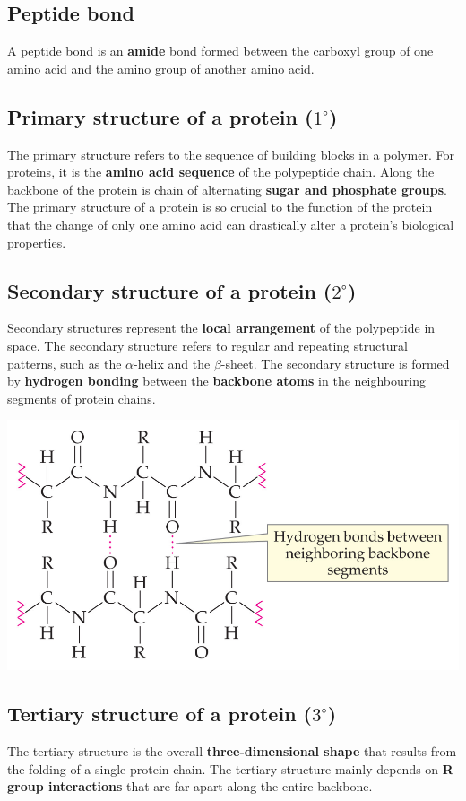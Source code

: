 \documentclass[11pt]{article}
\begin{document}
\subsection{Peptide bond}
\label{sec:org8707292}
A peptide bond is an \textbf{amide} bond formed between the carboxyl group of one amino acid and the amino group of another amino acid.
\subsection{Primary structure of a protein (\(1^{\circ}\))}
\label{sec:org30cfe34}
The primary structure refers to the sequence of building blocks in a polymer. For proteins, it is the \textbf{amino acid sequence} of the polypeptide chain. Along the backbone of the protein is chain of alternating \textbf{sugar and phosphate groups}. The primary structure of a protein is so crucial to the function of the protein that the change of only one amino acid can drastically alter a protein's biological properties.
\subsection{Secondary structure of a protein (\(2^{\circ}\))}
\label{sec:orge7d5eb0}
Secondary structures represent the \textbf{local arrangement} of the polypeptide in space. The secondary structure refers to regular and repeating structural patterns, such as the \(\alpha\)-helix and the \(\beta\)-sheet. The secondary structure is formed by \textbf{hydrogen bonding} between the \textbf{backbone atoms} in the neighbouring segments of protein chains.

\begin{center}
\includegraphics[width=.9\linewidth]{./images/protein-hydrogen-bond.png}
\end{center}

\newpage
\subsection{Tertiary structure of a protein (\(3^{\circ}\))}
\label{sec:orgea5d7ba}
The tertiary structure is the overall \textbf{three-dimensional shape} that results from the folding of a single protein chain. The tertiary structure mainly depends on \textbf{R group interactions} that are far apart along the entire backbone.
\end{document}
